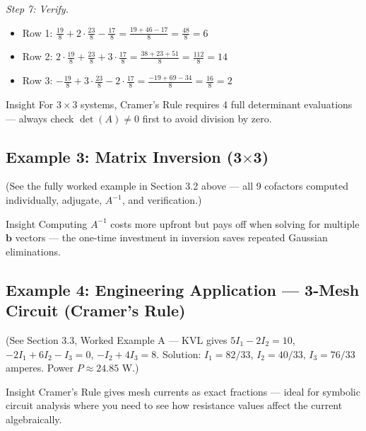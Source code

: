 \documentclass[12pt,a4paper]{article}
\begin{document}
\textit{Step 7: Verify.}
\begin{itemize}[noitemsep]
  \item Row 1: \(\tfrac{19}{8} + 2\cdot\tfrac{23}{8} - \tfrac{17}{8} = \tfrac{19+46-17}{8} = \tfrac{48}{8} = 6\) \checkmark
  \item Row 2: \(2\cdot\tfrac{19}{8} + \tfrac{23}{8} + 3\cdot\tfrac{17}{8} = \tfrac{38+23+51}{8} = \tfrac{112}{8} = 14\) \checkmark
  \item Row 3: \(-\tfrac{19}{8} + 3\cdot\tfrac{23}{8} - 2\cdot\tfrac{17}{8} = \tfrac{-19+69-34}{8} = \tfrac{16}{8} = 2\) \checkmark
\end{itemize}

\begin{learnbox}{Insight}
For \(3\times3\) systems, Cramer's Rule requires 4 full determinant evaluations --- always check \(\det(A) \neq 0\) first to avoid division by zero.
\end{learnbox}

\subsection*{Example 3: Matrix Inversion (3$\times$3)}

(See the fully worked example in Section 3.2 above --- all 9 cofactors computed individually, adjugate, \(A^{-1}\), and verification.)

\begin{learnbox}{Insight}
Computing \(A^{-1}\) costs more upfront but pays off when solving for multiple \(\mathbf{b}\) vectors --- the one-time investment in inversion saves repeated Gaussian eliminations.
\end{learnbox}

\subsection*{Example 4: Engineering Application --- 3-Mesh Circuit (Cramer's Rule)}

(See Section 3.3, Worked Example A --- KVL gives \(5I_1-2I_2=10\), \(-2I_1+6I_2-I_3=0\), \(-I_2+4I_3=8\). Solution: \(I_1 = 82/33\), \(I_2 = 40/33\), \(I_3 = 76/33\) amperes. Power \(P \approx 24.85\) W.)

\begin{learnbox}{Insight}
Cramer's Rule gives mesh currents as exact fractions --- ideal for symbolic circuit analysis where you need to see how resistance values affect the current algebraically.
\end{learnbox}
\end{document}
